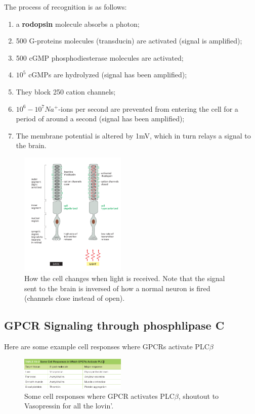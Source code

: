\documentclass[../main.tex]{subfiles}
\begin{document}
The process of recognition is as follows:
\begin{enumerate}
	\item a \textbf{rodopsin} molecule absorbs a photon;
	\item 500 G-proteins molecules (transducin) are activated (signal is amplified);
	\item 500 cGMP phosphodiesterase molecules are activated;
	\item $10^{5}$ cGMPs are hydrolyzed (signal has been amplified);
	\item They block 250 cation channels;
	\item $10^{6} - 10^{7} Na^{+}$-ions per second are prevented from entering the cell for a period of around a second (signal has been amplified);
	\item The membrane potential is altered by 1mV, which in turn relays a signal to the brain. 
\end{enumerate}

\begin{figure}[H]
	\centering
	\includegraphics[width=0.45\textwidth]{cGMP_rhod}
	\caption{How the cell changes when light is received. Note that the signal sent to the brain is inversed of how a normal neuron is fired (channels close instead of open).}
\end{figure}

\subsection{GPCR Signaling through phosphlipase C}

Here are some example cell responses where GPCRs activate PLC$\beta$
\begin{figure}[H]
	\centering
	\includegraphics[width=0.45\textwidth]{PLC_ex}
	\caption{Some cell responses where GPCR activates PLC$\beta$, shoutout to Vasopressin for all the lovin'.}
\end{figure}
\end{document}
